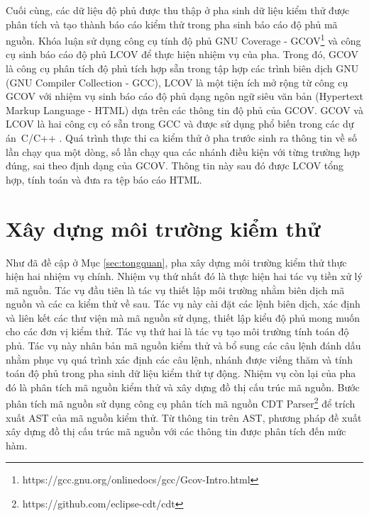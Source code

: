 Cuối cùng, các dữ liệu độ phủ được thu thập ở pha sinh dữ liệu kiểm thử được phân tích và tạo thành báo cáo kiểm thử trong pha sinh báo cáo độ phủ mã nguồn. Khóa luận sử dụng công cụ tính độ phủ GNU Coverage - GCOV\footnote{https://gcc.gnu.org/onlinedocs/gcc/Gcov-Intro.html} và công cụ sinh báo cáo độ phủ LCOV để thực hiện nhiệm vụ của pha. Trong đó, GCOV là công cụ phân tích độ phủ tích hợp sẵn trong tập hợp các trình biên dịch GNU (GNU Compiler Collection - GCC), LCOV là một tiện ích mở rộng từ công cụ GCOV với nhiệm vụ sinh báo cáo độ phủ dạng ngôn ngữ siêu văn bản (Hypertext Markup Language - HTML) dựa trên các thông tin độ phủ của GCOV. GCOV và LCOV là hai công cụ có sẵn trong GCC và được sử dụng phổ biến trong các dự án~C/C++ \cite{hu2021software}. Quá trình thực thi ca kiểm thử ở pha trước sinh ra thông tin về số lần chạy qua một dòng, số lần chạy qua các nhánh điều kiện với từng trường hợp đúng, sai theo định dạng của GCOV. Thông tin này sau đó được LCOV tổng hợp, tính toán và đưa ra tệp báo cáo HTML.

\section{Xây dựng môi trường kiểm thử} \label{sec:3-build-env}
Như đã đề cập ở Mục \autoref{sec:tongquan}, pha xây dựng môi trường kiểm thử thực hiện hai nhiệm vụ chính. Nhiệm vụ thứ nhất đó là thực hiện hai tác vụ tiền xử lý mã nguồn. Tác vụ đầu tiên là tác vụ thiết lập môi trường nhằm biên dịch mã nguồn và các ca kiểm thử về sau. Tác vụ này cài đặt các lệnh biên dịch, xác định và liên kết các thư viện mà mã nguồn sử dụng, thiết lập kiểu độ phủ mong muốn cho các đơn vị kiểm thử. Tác vụ thứ hai là tác vụ tạo môi trường tính toán độ phủ. Tác vụ này nhân bản mã nguồn kiểm thử và bổ sung các câu lệnh đánh dấu nhằm phục vụ quá trình xác định các câu lệnh, nhánh được viếng thăm và tính toán độ phủ trong pha sinh dữ liệu kiểm thử tự động. Nhiệm vụ còn lại của pha đó là phân tích mã nguồn kiểm thử và xây dựng đồ thị cấu trúc mã nguồn. Bước phân tích mã nguồn sử dụng công cụ phân tích mã nguồn CDT Parser\footnote{https://github.com/eclipse-cdt/cdt} để trích xuất AST của mã nguồn kiểm thử. Từ thông tin trên AST, phương pháp đề xuất xây dựng đồ thị cấu trúc mã nguồn với các thông tin được phân tích đến mức hàm.

